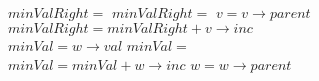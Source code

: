 \documentclass{article}
\begin{document}
\begin{algorithm}[h!]
\begin{algorithmic}[0]
                                \State $minValRight =$ 
                            \EndIf
                            \State $minValRight =$ 
                        \EndIf
                        \State $v = v \rightarrow parent$
                        \State $minValRight = minValRight + v \rightarrow inc$
                    \EndWhile
                \EndIf
                \\
                \State $minVal = w \rightarrow val$
                \State $minVal =$ 
                \\
                    \State $minVal = minVal + w \rightarrow inc$
                    \State $w = w \rightarrow parent$
                \EndWhile
                \\
                \State {}
            \EndProcedure
        \end{algorithmic}
    \end{algorithm}


\clearpage
\end{document}
